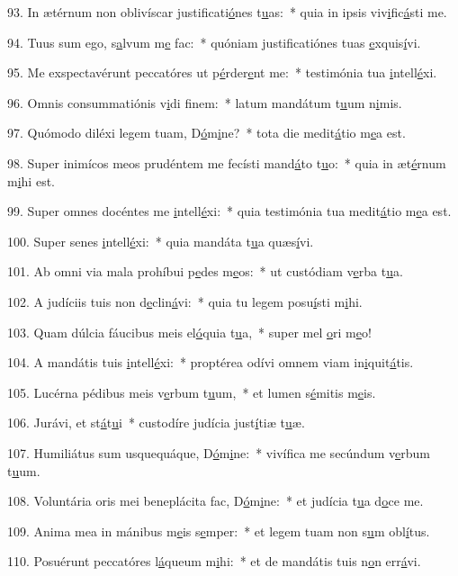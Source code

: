 93. In ætérnum non oblivíscar justificati\uline{ó}nes t\uline{u}as:~* quia in ipsis viv\uline{i}fic\uline{á}sti me.\par 
94. Tuus sum ego, s\uline{a}lvum m\uline{e} fac:~* quóniam justificatiónes tuas \uline{e}xquis\uline{í}vi.\par 
95. Me exspectavérunt peccatóres ut p\uline{é}rder\uline{e}nt me:~* testimónia tua \uline{i}ntell\uline{é}xi.\par 
96. Omnis consummatiónis v\uline{i}di f\uline{i}nem:~* latum mandátum t\uline{u}um n\uline{i}mis.\par 
97. Quómodo diléxi legem tuam, D\uline{ó}m\uline{i}ne?~* tota die medit\uline{á}tio m\uline{e}a est.\par 
98. Super inimícos meos prudéntem me fecísti mand\uline{á}to t\uline{u}o:~* quia in æt\uline{é}rnum m\uline{i}hi est.\par 
99. Super omnes docéntes me \uline{i}ntell\uline{é}xi:~* quia testimónia tua medit\uline{á}tio m\uline{e}a est.\par 
100. Super senes \uline{i}ntell\uline{é}xi:~* quia mandáta t\uline{u}a quæs\uline{í}vi.\par 
101. Ab omni via mala prohíbui p\uline{e}des m\uline{e}os:~* ut custódiam v\uline{e}rba t\uline{u}a.\par 
102. A judíciis tuis non d\uline{e}clin\uline{á}vi:~* quia tu legem posu\uline{í}sti m\uline{i}hi.\par 
103. Quam dúlcia fáucibus meis el\uline{ó}quia t\uline{u}a,~* super mel \uline{o}ri m\uline{e}o!\par 
104. A mandátis tuis \uline{i}ntell\uline{é}xi:~* proptérea odívi omnem viam in\uline{i}quit\uline{á}tis.\par 
105. Lucérna pédibus meis v\uline{e}rbum t\uline{u}um,~* et lumen s\uline{é}mitis m\uline{e}is.\par 
106. Jurávi, et st\uline{á}t\uline{u}i~* custodíre judícia just\uline{í}tiæ t\uline{u}æ.\par 
107. Humiliátus sum usquequáque, D\uline{ó}m\uline{i}ne:~* vivífica me secúndum v\uline{e}rbum t\uline{u}um.\par 
108. Voluntária oris mei beneplácita fac, D\uline{ó}m\uline{i}ne:~* et judícia t\uline{u}a d\uline{o}ce me.\par 
109. Anima mea in mánibus m\uline{e}is s\uline{e}mper:~* et legem tuam non s\uline{u}m obl\uline{í}tus.\par 
110. Posuérunt peccatóres l\uline{á}queum m\uline{i}hi:~* et de mandátis tuis n\uline{o}n err\uline{á}vi.\par 
